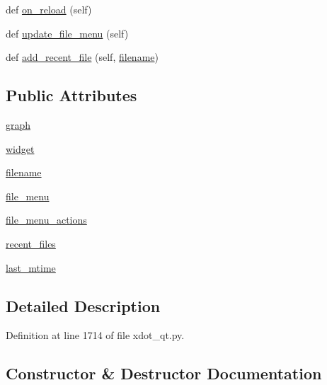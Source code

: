 \begin{DoxyCompactItemize}
\item 
def \hyperlink{classsmacc__viewer_1_1xdot_1_1xdot__qt_1_1DotWindow_aa01b2325040890c37c11027c0ffe6135}{on\+\_\+reload} (self)
\item 
def \hyperlink{classsmacc__viewer_1_1xdot_1_1xdot__qt_1_1DotWindow_a8b933eef6595908c1ac56b7b9d40cbfc}{update\+\_\+file\+\_\+menu} (self)
\item 
def \hyperlink{classsmacc__viewer_1_1xdot_1_1xdot__qt_1_1DotWindow_a1524d369a1d442bf734a99b42a3e3ea5}{add\+\_\+recent\+\_\+file} (self, \hyperlink{classsmacc__viewer_1_1xdot_1_1xdot__qt_1_1DotWindow_a8be84c72284dbb6ae2d6e65a03617b23}{filename})
\end{DoxyCompactItemize}
\subsection*{Public Attributes}
\begin{DoxyCompactItemize}
\item 
\hyperlink{classsmacc__viewer_1_1xdot_1_1xdot__qt_1_1DotWindow_adbc10dcc7b25ae1558c43b84308181bd}{graph}
\item 
\hyperlink{classsmacc__viewer_1_1xdot_1_1xdot__qt_1_1DotWindow_a3a941e7b121c8ce6478a4591e0f9f263}{widget}
\item 
\hyperlink{classsmacc__viewer_1_1xdot_1_1xdot__qt_1_1DotWindow_a8be84c72284dbb6ae2d6e65a03617b23}{filename}
\item 
\hyperlink{classsmacc__viewer_1_1xdot_1_1xdot__qt_1_1DotWindow_ad99f07df7efcd8ccbc6809e7536c8ad5}{file\+\_\+menu}
\item 
\hyperlink{classsmacc__viewer_1_1xdot_1_1xdot__qt_1_1DotWindow_a812d913b31f5ef7717e4b0687e8cde4b}{file\+\_\+menu\+\_\+actions}
\item 
\hyperlink{classsmacc__viewer_1_1xdot_1_1xdot__qt_1_1DotWindow_a6eabf9d0596a910be7ecb943d65e7494}{recent\+\_\+files}
\item 
\hyperlink{classsmacc__viewer_1_1xdot_1_1xdot__qt_1_1DotWindow_ad89b946c94e2cf6bd4d9b7caa01eeb80}{last\+\_\+mtime}
\end{DoxyCompactItemize}


\subsection{Detailed Description}


Definition at line 1714 of file xdot\+\_\+qt.\+py.



\subsection{Constructor \& Destructor Documentation}
